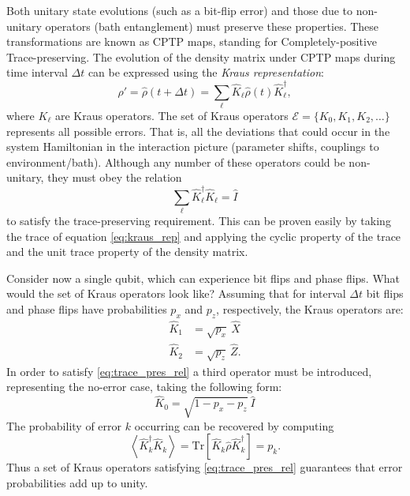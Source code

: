 Both unitary state evolutions (such as a bit-flip error) and those due to non-unitary operators (bath entanglement) must preserve these properties. These transformations are known as CPTP maps, standing for Completely-positive Trace-preserving. The evolution of the density matrix under CPTP maps during time interval $\Delta t$ can be expressed using the \textit{Kraus representation}:
\begin{equation}
    \hat\rho'=\hat\rho(t+\Delta t)= \sum_\ell \hat K_\ell \hat\rho(t) \hat K_\ell^\dagger,
    \label{eq:kraus_rep}
\end{equation}
where $K_\ell$ are Kraus operators. The set of Kraus operators $\mathcal{E}=\{ K_0,K_1,K_2,\dots\}$ represents all possible errors. That is, all the deviations that could occur in the system Hamiltonian in the interaction picture (parameter shifts, couplings to environment/bath). Although any number of these operators could be non-unitary, they must obey the relation 
\begin{equation}
    \sum_\ell \hat K_\ell^\dagger \hat K_\ell = \hat I
    \label{eq:trace_pres_rel}
\end{equation} 
to satisfy the trace-preserving requirement. This can be proven easily by taking the trace of equation \eqref{eq:kraus_rep} and applying the cyclic property of the trace and the unit trace property of the density matrix.

Consider now a single qubit, which can experience bit flips and phase flips. What would the set of Kraus operators look like? Assuming that for interval $\Delta t$ bit flips and phase flips have probabilities $p_x$ and $p_z$, respectively, the Kraus operators are:
\begin{eqnarray}
    \hat K_1 &= \sqrt{p_x}\ \hat X \\
    \hat K_2 &= \sqrt{p_z}\ \hat Z.
\end{eqnarray}
In order to satisfy \eqref{eq:trace_pres_rel} a third operator must be introduced, representing the no-error case, taking the following form:
\begin{equation}
    \hat K_0 = \sqrt{1-p_x-p_z}\ \hat I
\end{equation}
The probability of error $k$ occurring can be recovered by computing
\begin{equation}
    \left<\hat K_k^\dagger \hat K_k\right> = \mathrm{Tr}\left[\hat K_k \hat\rho \hat K_k^\dagger\right] = p_k.
\end{equation}
Thus a set of Kraus operators satisfying \eqref{eq:trace_pres_rel} guarantees that error probabilities add up to unity.

